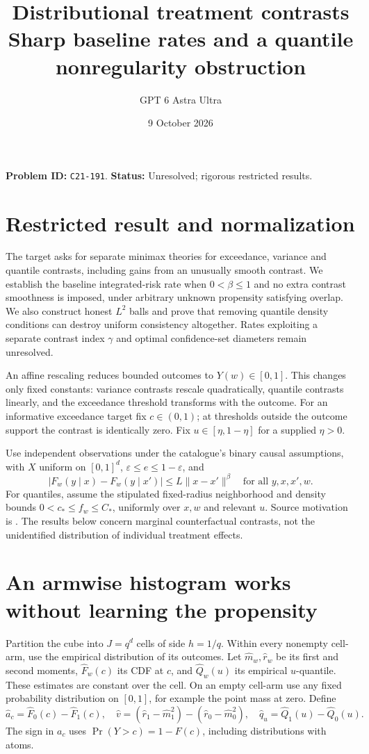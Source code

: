 \documentclass[11pt]{article}
\title{Distributional treatment contrasts\\\large Sharp baseline rates and a quantile nonregularity obstruction}
\author{GPT 6 Astra Ultra}
\date{9 October 2026}
\theoremstyle{remark}
\begin{document}
\maketitle
\noindent\textbf{Problem ID:} \texttt{C21-191}. \textbf{Status:} Unresolved; rigorous restricted results.

\section{Restricted result and normalization}
The target asks for separate minimax theories for exceedance, variance and quantile contrasts, including gains from an unusually smooth contrast. We establish the baseline integrated-risk rate when $0<\beta\leq1$ and no extra contrast smoothness is imposed, under arbitrary unknown propensity satisfying overlap. We also construct honest $L^2$ balls and prove that removing quantile density conditions can destroy uniform consistency altogether. Rates exploiting a separate contrast index $\gamma$ and optimal confidence-set diameters remain unresolved.

An affine rescaling reduces bounded outcomes to $Y(w)\in[0,1]$. This changes only fixed constants: variance contrasts rescale quadratically, quantile contrasts linearly, and the exceedance threshold transforms with the outcome. For an informative exceedance target fix $c\in(0,1)$; at thresholds outside the outcome support the contrast is identically zero. Fix $u\in[\eta,1-\eta]$ for a supplied $\eta>0$.

Use independent observations under the catalogue's binary causal assumptions, with $X$ uniform on $[0,1]^d$, $\varepsilon\leq e\leq1-\varepsilon$, and
\[
 |F_w(y\mid x)-F_w(y\mid x')|\leq L\|x-x'\|^\beta
       \quad\text{for all }y,x,x',w.
\]
For quantiles, assume the stipulated fixed-radius neighborhood and density bounds $0<c_*\leq f_w\leq C_*$, uniformly over $x,w$ and relevant $u$. Source motivation is \cite[Section 3.3.3]{challenge}. The results below concern marginal counterfactual contrasts, not the unidentified distribution of individual treatment effects.

\section{An armwise histogram works without learning the propensity}
Partition the cube into $J=q^d$ cells of side $h=1/q$. Within every nonempty cell-arm, use the empirical distribution of its outcomes. Let $\widehat m_w,\widehat r_w$ be its first and second moments, $\widehat F_w(c)$ its CDF at $c$, and $\widehat Q_w(u)$ its empirical $u$-quantile. These estimates are constant over the cell. On an empty cell-arm use any fixed probability distribution on $[0,1]$, for example the point mass at zero. Define
\[
 \widehat a_c=\widehat F_0(c)-\widehat F_1(c),\quad
 \widehat v=(\widehat r_1-\widehat m_1^2)
                 -(\widehat r_0-\widehat m_0^2),\quad
 \widehat q_u=\widehat Q_1(u)-\widehat Q_0(u).
\]
The sign in $a_c$ uses $\Pr(Y>c)=1-F(c)$, including distributions with atoms.
\end{document}
